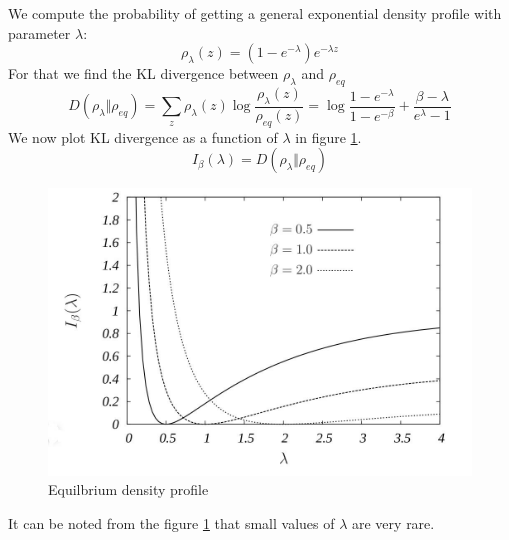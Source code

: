 \documentclass[letterpaper,english,10pt]{article}
\begin{document}
\begin{exmp}
 We compute the probability of getting a general exponential density profile with parameter $\lambda$:
 \begin{equation}
 	\rho_{\lambda}(z)= (1-e^{-\lambda})e^{-\lambda z}
 \end{equation}
 For that we find the KL divergence between $\rho_{\lambda}$ and $\rho_{eq}$
 \begin{equation}
     D(\rho_{\lambda} \Vert \rho_{eq}) = 
     \sum_{z}^{} \rho_{\lambda}(z) \log \frac{\rho_{\lambda}(z)}{\rho_{eq}(z)} =     
     \log{  \frac{1-e^{-\lambda}}{1-e^{-\beta}}  + \frac{\beta -\lambda}{e^{\lambda}-1}}
 \end{equation}
 We now plot KL divergence as a function of $\lambda$ in figure \ref{fig:Earthatmo}.
 \begin{equation}
 	I_{\beta}(\lambda)= D(\rho_{\lambda} \Vert \rho_{eq})
 \end{equation}
 \begin{figure}[h!] \label{fig}
  \includegraphics[width=\linewidth]{EarthAtmo.jpeg}
  \caption{Equilbrium density profile}
  \label{fig:Earthatmo}
\end{figure}
It can be noted from the figure \ref{fig:Earthatmo} that small values of $\lambda$ are very rare.
 \end{exmp}
\end{document}
